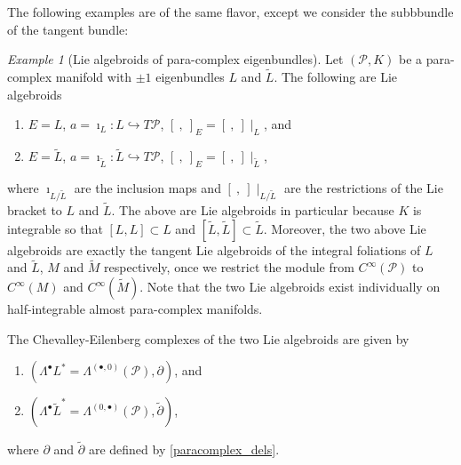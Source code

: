 \documentclass[letterpaper,12pt]{article}
\newcommand{\id}{\mathbbm{1}}
\newcommand{\PS}{\mathcal{P}}
\newcommand{\p}{\partial}
\newcommand{\pt}{\tilde{\partial}}
\newcommand{\Lt}{{\tl{L}}}
\newcommand{\brac}{[\ ,\ ]}
\newcommand{\Mt}{\tl{M}}
\def\tl{\tilde}
\theoremstyle{definition}
\theoremstyle{remark}
\theoremstyle{examples}
\newtheorem{Ex}[theorem]{Example}
\begin{document}
The following examples are of the same flavor, except we consider the subbbundle of the tangent bundle:
\begin{Ex}[Lie algebroids of para-complex eigenbundles]\label{ex:real-lie-algds-on-paracpx}
Let $(\PS,K)$ be a para-complex manifold with $\pm 1$ eigenbundles $L$ and $\Lt$. The following are Lie algebroids
\begin{enumerate}
\item $E=L$, $a=\imath_L:L\hookrightarrow T\PS$, $\brac_E=\brac\mid_L$, and
\item $E=\Lt$, $a=\imath_\Lt:\Lt\hookrightarrow T\PS$, $\brac_E=\brac\mid_\Lt$,
\end{enumerate}
where $\imath_{L/\Lt}$ are the inclusion maps and $\brac\mid_{L/\Lt}$ are the restrictions of the Lie bracket to $L$ and $\Lt$. The above are Lie algebroids in particular because $K$ is integrable so that $[L,L]\subset L$ and $[\Lt,\Lt]\subset \Lt$. Moreover, the two above Lie algebroids are exactly the tangent Lie algebroids of the integral foliations of $L$ and $\Lt$, $M$ and $\Mt$ respectively, once we restrict the module from $C^\infty(\PS)$ to $C^\infty(M)$ and $C^\infty(\Mt)$. Note that the two Lie algebroids exist individually on half-integrable almost para-complex manifolds.

The Chevalley-Eilenberg complexes of the two Lie algebroids are given by
\begin{enumerate}
\item $(\Lambda^\bullet L^*=\Lambda^{(\bullet,0)}(\PS),\p)$, and
\item $(\Lambda^\bullet \Lt^*=\Lambda^{(0,\bullet)}(\PS),\pt)$,
\end{enumerate}
where $\p$ and $\pt$ are defined by \eqref{paracomplex_dels}.
\end{Ex}
\end{document}
